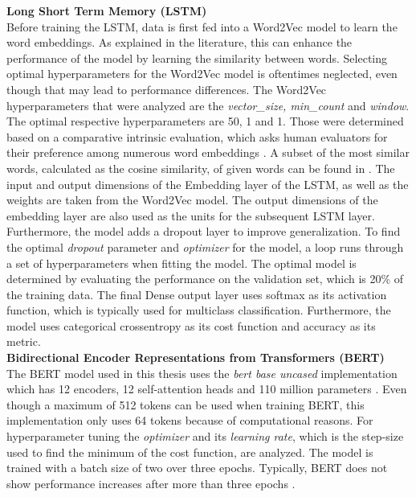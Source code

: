 \documentclass[11pt, a4paper]{article}
\begin{document}
\noindent\textbf{Long Short Term Memory (LSTM)}\\
Before training the LSTM, data is first fed into a Word2Vec model to learn the word embeddings. As explained in the literature, this can enhance the performance of the model by learning the similarity between words.
Selecting optimal hyperparameters for the Word2Vec model is oftentimes neglected, even though that may lead to performance differences.
The Word2Vec hyperparameters that were analyzed are the \emph{vector\_size, min\_count} and \emph{window}. The optimal respective hyperparameters are 50, 1 and 1. Those were determined based on a comparative intrinsic evaluation,
which asks human evaluators for their preference among numerous word embeddings \citep{schnabel2015embeddings}.
A subset of the most similar words, calculated as the cosine similarity, of given words can be found in .
The input and output dimensions of the Embedding layer of the LSTM, as well as the weights are taken from the Word2Vec model.
The output dimensions of the embedding layer are also used as the units for the subsequent LSTM layer. Furthermore, the model adds a dropout layer to improve generalization. To find the optimal \emph{dropout} parameter and \emph{optimizer} for the model,
a loop runs through a set of hyperparameters when fitting the model. The optimal model is determined by evaluating the performance on the validation set, which is 20\% of the training data. 
The final Dense output layer uses softmax as its activation function, which is typically used for multiclass classification. 
Furthermore, the model uses categorical crossentropy as its cost function and accuracy as its metric.\\

\noindent\textbf{Bidirectional Encoder Representations from Transformers (BERT)}\\
The BERT model used in this thesis uses the \emph{bert base uncased} implementation which has 12 encoders, 12 self-attention heads and
110 million parameters \citep{devlin2019bert}. Even though a maximum of 512 tokens can be used when training BERT, this implementation only uses 64 tokens because of computational reasons.
For hyperparameter tuning the \emph{optimizer} and its \emph{learning rate}, which is the step-size used to find the minimum of the cost function, are analyzed.
The model is trained with a batch size of two over three epochs. Typically, BERT does not show performance increases after more than three epochs \citep{lim2020fine}.\\
\end{document}
